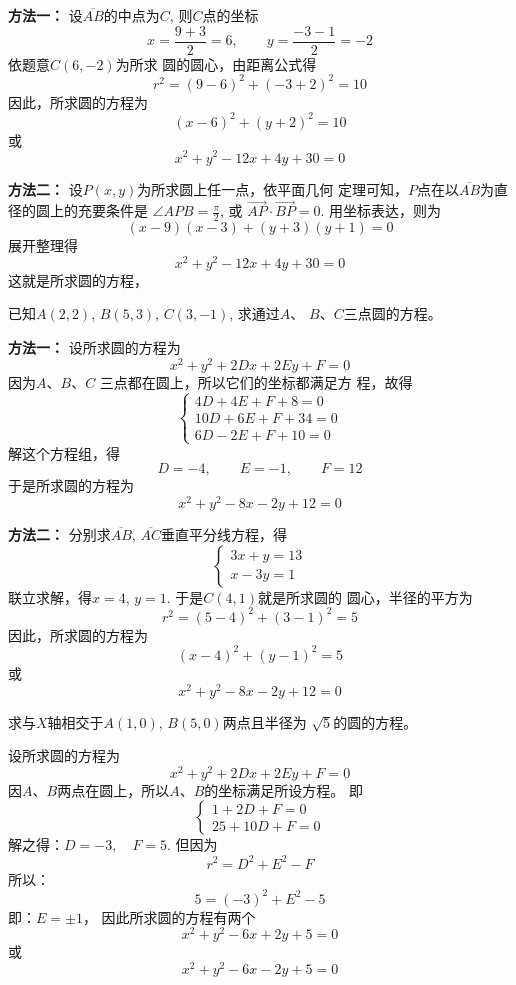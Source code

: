 \begin{solution}
\textbf{方法一：}  设$\overline{AB}$的中点为$C$, 则$C$点的坐标
\[x=\frac{9+3}{2}=6,\qquad y=\frac{-3-1}{2}=-2\]
依题意$C(6,-2)$为所求
圆的圆心，由距离公式得
\[r^2=(9-6)^2+(-3+2)^2=10\]
因此，所求圆的方程为
\[(x-6)^2+(y+2)^2=10\]
或
\[x^2+y^2-12x+4y+30=0\]

\textbf{方法二：}
 设$P(x,y)$为所求圆上任一点，依平面几何
定理可知，$P$点在以$\overline{AB}$为直径的圆上的充要条件是
$\angle APB=\frac{\pi}{2}$, 或
$\Vec{AP}\cdot \Vec{BP}=0$.
用坐标表达，则为
\[(x-9)(x-3)+(y+3)(y+1)=0\]
展开整理得
\[x^2+y^2-12x+4y+30=0\]
这就是所求圆的方程，
\end{solution}


\begin{example}
    已知$A(2,2)$, $B(5,3)$, $C(3,-1)$, 求通过$A$、
$B$、$C$三点圆的方程。
\end{example}


\begin{solution}
    \textbf{方法一：} 设所求圆的方程为
\[x^2+y^2+2Dx+2Ey+F=0\]
因为$A$、$B$、$C$ 三点都在圆上，所以它们的坐标都满足方
程，故得
\[\begin{cases}
    4D+4E+F+8=0\\
10D+6E+F+34=0\\
6D-2E+F+10=0
\end{cases}\]
解这个方程组，得
\[D=-4,\qquad E=-1,\qquad F=12\]
于是所求圆的方程为
\[x^2+y^2-8x-2y+12=0\]

\textbf{方法二：} 分别求$\overline{AB}$, $\overline{AC}$垂直平分线方程，得
\[\begin{cases}
   3x+y=13\\
x-3y=1
\end{cases}\]
联立求解，得$x=4$, $y=1$. 于是$C(4,1)$就是所求圆的
圆心，半径的平方为
\[r^2=(5-4)^2+(3-1)^2=5\]
因此，所求圆的方程为
\[(x-4)^2+(y-1)^2=5\]
或
\[x^2+y^2-8x-2y+12=0\]
\end{solution}

\begin{example}
    求与$X$轴相交于$A(1,0)$, $B(5,0)$两点且半径为
$\sqrt{5}$的圆的方程。
\end{example}

\begin{solution}
    设所求圆的方程为
\[x^2+y^2+2Dx+2Ey+F=0\]
因$A$、$B$两点在圆上，所以$A$、$B$的坐标满足所设方程。
即
\[\begin{cases}
    1+2D+F=0\\
25+10D+F=0
\end{cases}\]
解之得：$D=-3,\quad F=5$.
但因为
\[r^2=D^2+E^2-F\]
所以：
\[5=(-3)^2+E^2-5\]
即：$E=\pm 1$，
因此所求圆的方程有两个
\[x^2+y^2-6x+2y+5=0\]
或
\[x^2+y^2-6x-2y+5=0\]
\end{solution}





















